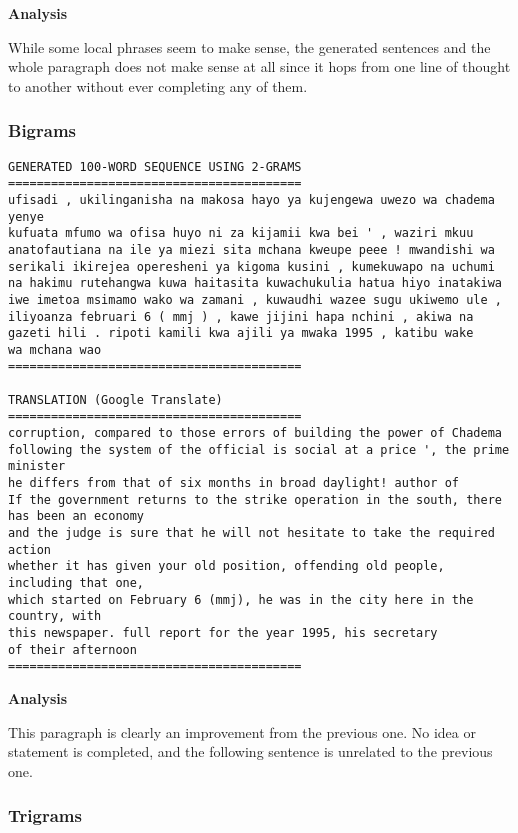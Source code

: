 \textbf{Analysis}

While some local phrases seem to make sense,
the generated sentences and the whole paragraph
does not make sense at all since it hops from one line
of thought to another without ever completing any of them.

\newpage
\subsubsection{Bigrams}

\begin{center}
\begin{verbatim}
GENERATED 100-WORD SEQUENCE USING 2-GRAMS
=========================================
ufisadi , ukilinganisha na makosa hayo ya kujengewa uwezo wa chadema yenye
kufuata mfumo wa ofisa huyo ni za kijamii kwa bei ' , waziri mkuu
anatofautiana na ile ya miezi sita mchana kweupe peee ! mwandishi wa
serikali ikirejea operesheni ya kigoma kusini , kumekuwapo na uchumi
na hakimu rutehangwa kuwa haitasita kuwachukulia hatua hiyo inatakiwa
iwe imetoa msimamo wako wa zamani , kuwaudhi wazee sugu ukiwemo ule ,
iliyoanza februari 6 ( mmj ) , kawe jijini hapa nchini , akiwa na
gazeti hili . ripoti kamili kwa ajili ya mwaka 1995 , katibu wake
wa mchana wao
=========================================

TRANSLATION (Google Translate)
=========================================
corruption, compared to those errors of building the power of Chadema
following the system of the official is social at a price ', the prime minister
he differs from that of six months in broad daylight! author of
If the government returns to the strike operation in the south, there has been an economy
and the judge is sure that he will not hesitate to take the required action
whether it has given your old position, offending old people, including that one,
which started on February 6 (mmj), he was in the city here in the country, with
this newspaper. full report for the year 1995, his secretary
of their afternoon
=========================================
\end{verbatim}
\end{center}

\textbf{Analysis}

This paragraph is clearly an improvement from the previous one.
No idea or statement is completed, and the following
sentence is unrelated to the previous one.

\newpage
\subsubsection{Trigrams}

